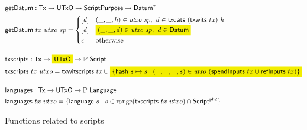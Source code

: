 
\begin{figure*}
  \begin{align*}
    & \fun{getDatum} : \Tx \to \UTxO \to \ScriptPurpose \to \seqof{\Datum} \\
    & \fun{getDatum}~{tx}~{utxo}~{sp} =
      \begin{cases}
        [\var{d}] & (\_, \_, h) \in \var{utxo}~\var{sp},~ \var{d} \in \fun{txdats}~(\fun{txwits}~tx)~ \var{h} \\
        [\var{d}] & \hldiff{(\_, \_, d) \in \var{utxo}~\var{sp},~ \var{d} \in \Datum} \\
        \epsilon  & \text{otherwise}
      \end{cases}
    \nextdef
    & \fun{txscripts} : \Tx \to \hldiff{\UTxO} \to \powerset{\Script} \\
    & \fun{txscripts}~tx~utxo = \fun{txwitscripts}~tx \cup \hldiff{\{ \fun{hash}~s \mapsto s \mid (\_, \_, \_, s) \in \var{utxo}~(\fun{spendInputs}~tx \cup \fun{refInputs}~tx)\}}
    \nextdef
    & \fun{languages} : \Tx \to \UTxO \to \powerset{\Language} \\
    & \fun{languages}~tx~utxo =
      \{\fun{language}~s \mid s \in \range (\fun{txscripts}~tx~utxo) \cap \ScriptPhTwo\}
  \end{align*}
  \caption{Functions related to scripts}
  \label{fig:functions:data}
\end{figure*}

